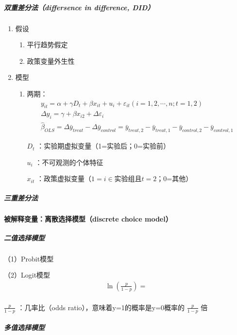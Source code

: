 \documentclass[12pt]{book}
\begin{document}
\subparagraph{双重差分法（differsence in difference, DID）}

\begin{enumerate}[1.]
    \item 假设
          \begin{enumerate}[(1)]
              \item 平行趋势假定
              \item 政策变量外生性
          \end{enumerate}
    \item 模型
          \begin{enumerate}[(1)]
              \item 两期：
                    \begin{gather*}
                        y_{it}=\alpha+\gamma D_t+\beta x_{it}+u_i+\varepsilon_{it} (i=1,2,\cdots,n;t=1,2) \\ \Delta y_i = \gamma+\beta x_{i2}+\Delta \varepsilon_i \\ {\hat{\beta}}_{OLS}=\Delta{\bar{y}}_{treat}-\Delta \bar{y}_{control} = \bar{y}_{treat,2}-\bar{y}_{treat,1}- \bar{y}_{control,2}-\bar{y}_{control,1}\
                    \end{gather*}
                    \par $D_t$ ：实验期虚拟变量（1=实验后；0=实验前）
                    \par $u_i$ ：不可观测的个体特征
                    \par $x_{it}$ ：政策虚拟变量（$1=i\in $实验组且$t=2$；0=其他）
          \end{enumerate}
\end{enumerate}


\subparagraph{三重差分法}


\paragraph{被解释变量：离散选择模型（discrete choice model）}


\subparagraph{二值选择模型}

（1）Probit模型

（2）Logit模型
\begin{gather*}
    \ln{\left(\frac{p}{1-p}\right)}=\\ 
\end{gather*}

$\frac{p}{1-p}$ ：几率比（odds ratio），意味着y=1的概率是y=0概率的 $\frac{p}{1-p}$ 倍

\subparagraph{多值选择模型}
\end{document}
